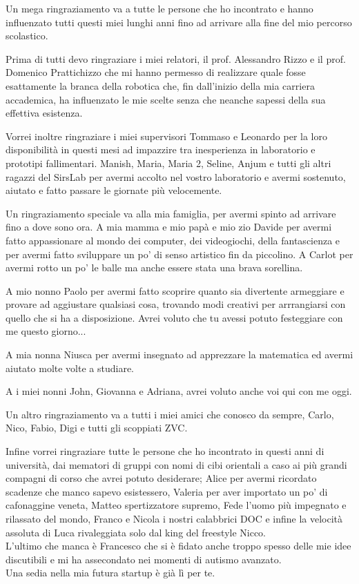 
\begin{acknowledgements}
\addchaptertocentry{\acknowledgementname}
Un mega ringraziamento va a tutte le persone che ho incontrato e hanno influenzato tutti questi miei lunghi anni fino ad arrivare alla fine del mio percorso scolastico.

Prima di tutti devo ringraziare i miei relatori, il prof. Alessandro Rizzo e il prof. Domenico Prattichizzo che mi hanno permesso di realizzare quale fosse esattamente la branca della robotica che, fin dall'inizio della mia carriera accademica, ha influenzato le mie scelte senza che neanche sapessi della sua effettiva esistenza.

Vorrei inoltre ringraziare i miei supervisori Tommaso e Leonardo per la loro disponibilità in questi mesi ad impazzire tra inesperienza in laboratorio e prototipi fallimentari. Manish, Maria, Maria 2, Seline, Anjum e tutti gli altri ragazzi del SirsLab per avermi accolto nel vostro laboratorio e avermi sostenuto, aiutato e fatto passare le giornate più velocemente.

Un ringraziamento speciale va alla mia famiglia, per avermi spinto ad arrivare fino a dove sono ora. A mia mamma e mio papà e mio zio Davide per avermi fatto appassionare al mondo dei computer, dei videogiochi, della fantascienza e per avermi fatto sviluppare un po' di senso artistico fin da piccolino. 
A Carlot per avermi rotto un po' le balle ma anche essere stata una brava sorellina.

A mio nonno Paolo per avermi fatto scoprire quanto sia divertente armeggiare e provare ad aggiustare qualsiasi cosa, trovando modi creativi per arrrangiarsi con quello che si ha a disposizione. Avrei voluto che tu avessi potuto festeggiare con me questo giorno...

A mia nonna Niusca per avermi insegnato ad apprezzare la matematica ed avermi aiutato molte volte a studiare.

A i miei nonni John, Giovanna e Adriana, avrei voluto anche voi qui con me oggi.

Un altro ringraziamento va a tutti i miei amici che conosco da sempre, Carlo, Nico, Fabio, Digi e tutti gli scoppiati ZVC.

Infine vorrei ringraziare tutte le persone che ho incontrato in questi anni di università, dai mematori di gruppi con nomi di cibi orientali a caso ai più grandi compagni di corso che avrei potuto desiderare; Alice per avermi ricordato scadenze che manco sapevo esistessero, Valeria per aver importato un po' di cafonaggine veneta, Matteo spertizzatore supremo, Fede l'uomo più impegnato e rilassato del mondo, Franco e Nicola i nostri calabbrici DOC e infine la velocità assoluta di Luca rivaleggiata solo dal king del freestyle Nicco.\\
L'ultimo che manca è Francesco che si è fidato anche troppo spesso delle mie idee discutibili e mi ha assecondato nei momenti di autismo avanzato.\\
Una sedia nella mia futura startup è già lì per te.


\end{acknowledgements}
